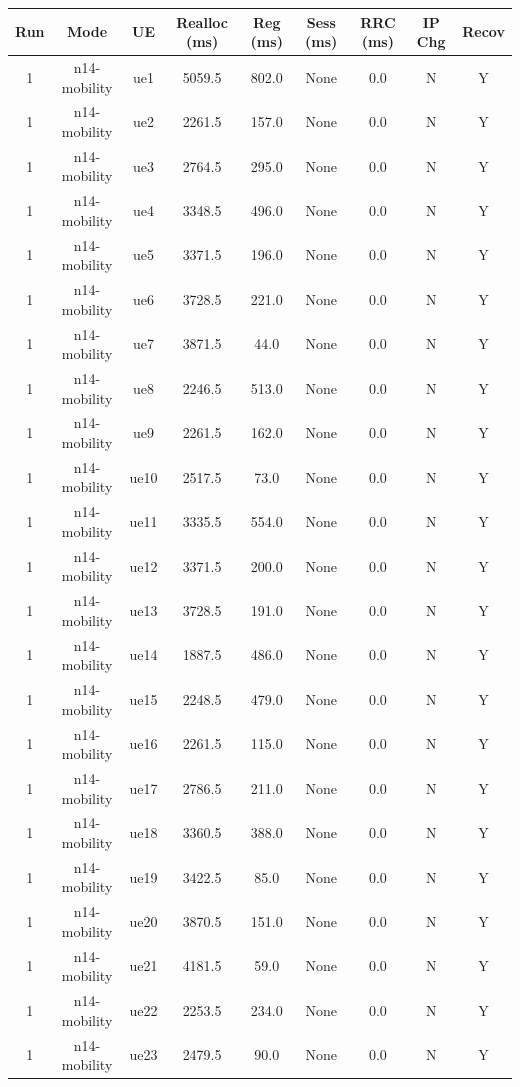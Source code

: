 \begin{table}[ht]
\centering
\begin{tabular}{|c|c|c|c|c|c|c|c|c|}
\hline
Run & Mode & UE & Realloc (ms) & Reg (ms) & Sess (ms) & RRC (ms) & IP Chg & Recov \\
\hline
1 & n14-mobility & ue1 & 5059.5 & 802.0 & None & 0.0 & N & Y \\
1 & n14-mobility & ue2 & 2261.5 & 157.0 & None & 0.0 & N & Y \\
1 & n14-mobility & ue3 & 2764.5 & 295.0 & None & 0.0 & N & Y \\
1 & n14-mobility & ue4 & 3348.5 & 496.0 & None & 0.0 & N & Y \\
1 & n14-mobility & ue5 & 3371.5 & 196.0 & None & 0.0 & N & Y \\
1 & n14-mobility & ue6 & 3728.5 & 221.0 & None & 0.0 & N & Y \\
1 & n14-mobility & ue7 & 3871.5 & 44.0 & None & 0.0 & N & Y \\
1 & n14-mobility & ue8 & 2246.5 & 513.0 & None & 0.0 & N & Y \\
1 & n14-mobility & ue9 & 2261.5 & 162.0 & None & 0.0 & N & Y \\
1 & n14-mobility & ue10 & 2517.5 & 73.0 & None & 0.0 & N & Y \\
1 & n14-mobility & ue11 & 3335.5 & 554.0 & None & 0.0 & N & Y \\
1 & n14-mobility & ue12 & 3371.5 & 200.0 & None & 0.0 & N & Y \\
1 & n14-mobility & ue13 & 3728.5 & 191.0 & None & 0.0 & N & Y \\
1 & n14-mobility & ue14 & 1887.5 & 486.0 & None & 0.0 & N & Y \\
1 & n14-mobility & ue15 & 2248.5 & 479.0 & None & 0.0 & N & Y \\
1 & n14-mobility & ue16 & 2261.5 & 115.0 & None & 0.0 & N & Y \\
1 & n14-mobility & ue17 & 2786.5 & 211.0 & None & 0.0 & N & Y \\
1 & n14-mobility & ue18 & 3360.5 & 388.0 & None & 0.0 & N & Y \\
1 & n14-mobility & ue19 & 3422.5 & 85.0 & None & 0.0 & N & Y \\
1 & n14-mobility & ue20 & 3870.5 & 151.0 & None & 0.0 & N & Y \\
1 & n14-mobility & ue21 & 4181.5 & 59.0 & None & 0.0 & N & Y \\
1 & n14-mobility & ue22 & 2253.5 & 234.0 & None & 0.0 & N & Y \\
1 & n14-mobility & ue23 & 2479.5 & 90.0 & None & 0.0 & N & Y \\

\end{tabular}
\end{table}
